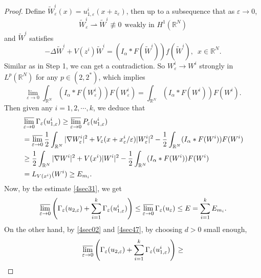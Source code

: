 \documentclass[12pt,reqno]{amsart}
\numberwithin{equation}{section}
\begin{document}
\begin{proof}
Define
$\widetilde{W}_{\varepsilon}^i(x)=u_{1,{\varepsilon}}^i(x+z_{\varepsilon})$, then up to a
subsequence that as ${\varepsilon}{\rightarrow}0$,
$$\widetilde{W}_{\varepsilon}^i\rightharpoonup \widetilde{W}^i\not\equiv0\ \ \text{weakly in}\,\, H^1({\mathbb R^N})$$ and $\widetilde{W}^i$ satisfies
\begin{equation*}
-\Delta \widetilde{W}^i+V(z^i)\widetilde{W}^i=(I_{\alpha}\ast F(\widetilde{W}^i))f(\widetilde{W}^i),\,\,\,x\in{\mathbb R^N}.
\end{equation*}
Similar as in Step 1, we can get a contradiction. So $W_{\varepsilon}^i\rightarrow W^i$ strongly in $L^p({\mathbb R^N})$ for any $p\in(2,2^\ast)$, which implies
\begin{equation}\label{4sec45}
\lim\limits_{{\varepsilon}\rightarrow
0}\int_{\mathbb R^N}(I_{\alpha}\ast F(W_{\varepsilon}^i))F(W_{\varepsilon}^i)=\int_{\mathbb R^N}(I_{\alpha}\ast F(W^i))F(W^i).
\end{equation}
Then given any $i=1,2,\cdots,k$, we deduce that
{\allowdisplaybreaks
\begin{equation}\label{4sec47}\aligned
&\varlimsup\limits_{{\varepsilon}\rightarrow0}\Gamma_{\varepsilon}(u_{1,{\varepsilon}}^i)\ge\varlimsup\limits_{{\varepsilon}\rightarrow0}P_{\varepsilon}(u_{1,{\varepsilon}}^i)\\
&=\varlimsup\limits_{{\varepsilon}\rightarrow0}\frac{1}{2}\int_{{\mathbb R}^N}|{\nabla} W_{\varepsilon}^i|^2+V_{\varepsilon}(x+x_{\varepsilon}^i/{\varepsilon})|W_{\varepsilon}^i|^2-\frac{1}{2}\int_{\mathbb R^N}(I_{\alpha}\ast F(W^i))F(W^i)\\
&\ge\frac{1}{2}\int_{{\mathbb R}^N}|{\nabla} W^i|^2+V(x^i)|W^i|^2-\frac{1}{2}\int_{\mathbb R^N}(I_{\alpha}\ast F(W^i))F(W^i)\\
&=L_{V(x^i)}(W^i)\geq E_{m_i}.
\endaligned
\end{equation}}Now, by the estimate \eqref{4sec31}, we get
\begin{equation}\label{4sec48}
\aligned \varlimsup\limits_{{\varepsilon}\rightarrow
0}\left(\Gamma_{\varepsilon}(u_{2,{\varepsilon}})+\sum\limits_{i=1}^k\Gamma_{\varepsilon}(u_{1,{\varepsilon}}^i)\right)
\leq \varlimsup\limits_{{\varepsilon}\rightarrow
0}\Gamma_{\varepsilon}(u_{\varepsilon})\leq E=\sum\limits_{i=1}^kE_{m_i}.
\endaligned
\end{equation}
On the other hand, by \eqref{4sec02} and \eqref{4sec47}, by choosing $d>0$ small enough,
\begin{equation}\label{4sec49}
\varlimsup\limits_{{\varepsilon}\rightarrow
0}\left(\Gamma_{\varepsilon}(u_{2,{\varepsilon}})+\sum\limits_{i=1}^k\Gamma_{\varepsilon}(u_{1,{\varepsilon}}^i)\right)\geq

\end{equation}
\end{proof}
\end{document}
